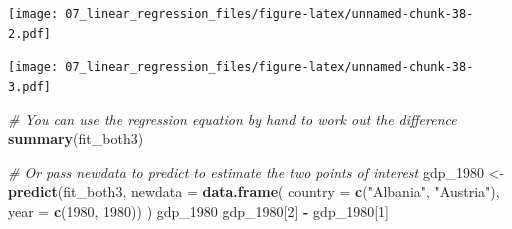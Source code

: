 \documentclass[
  12pt,
  krantz2]{krantz}
\makeatletter
\newenvironment{Shaded}{\begin{snugshade}}{\end{snugshade}}
\newcommand{\CommentTok}[1]{\textcolor[rgb]{0.56,0.35,0.01}{\textit{#1}}}
\newcommand{\DataTypeTok}[1]{\textcolor[rgb]{0.13,0.29,0.53}{#1}}
\newcommand{\DecValTok}[1]{\textcolor[rgb]{0.00,0.00,0.81}{#1}}
\newcommand{\KeywordTok}[1]{\textcolor[rgb]{0.13,0.29,0.53}{\textbf{#1}}}
\newcommand{\NormalTok}[1]{#1}
\newcommand{\OperatorTok}[1]{\textcolor[rgb]{0.81,0.36,0.00}{\textbf{#1}}}
\newcommand{\StringTok}[1]{\textcolor[rgb]{0.31,0.60,0.02}{#1}}
\newenvironment{kframe}{%
\medskip{}
\setlength{\fboxsep}{.8em}
 \def\at@end@of@kframe{}%
 \ifinner\ifhmode%
  \def\at@end@of@kframe{\end{minipage}}%
  \begin{minipage}{\columnwidth}%
 \fi\fi%
 \def\FrameCommand##1{\hskip\@totalleftmargin \hskip-\fboxsep
 \colorbox{shadecolor}{##1}\hskip-\fboxsep
     \hskip-\linewidth \hskip-\@totalleftmargin \hskip\columnwidth}%
 \MakeFramed {\advance\hsize-\width
   \@totalleftmargin\z@ \linewidth\hsize
   \@setminipage}}%
 {\par\unskip\endMakeFramed%
 \at@end@of@kframe}
\renewenvironment{Shaded}{\begin{kframe}}{\end{kframe}}
\makeatother
\begin{document}
\texttt{[image: 07\_linear\_regression\_files/figure-latex/unnamed-chunk-38-2.pdf]}

\begin{Shaded}
\end{Shaded}

\texttt{[image: 07\_linear\_regression\_files/figure-latex/unnamed-chunk-38-3.pdf]}

\begin{Shaded}
\begin{Highlighting}[]
\CommentTok{# You can use the regression equation by hand to work out the difference}
\KeywordTok{summary}\NormalTok{(fit_both3)}

\CommentTok{# Or pass newdata to predict to estimate the two points of interest}
\NormalTok{gdp_}\DecValTok{1980}\NormalTok{ <-}\StringTok{ }\KeywordTok{predict}\NormalTok{(fit_both3, }\DataTypeTok{newdata =} \KeywordTok{data.frame}\NormalTok{(}
  \DataTypeTok{country =} \KeywordTok{c}\NormalTok{(}\StringTok{"Albania"}\NormalTok{, }\StringTok{"Austria"}\NormalTok{),}
  \DataTypeTok{year =} \KeywordTok{c}\NormalTok{(}\DecValTok{1980}\NormalTok{, }\DecValTok{1980}\NormalTok{))}
\NormalTok{)}
\NormalTok{gdp_}\DecValTok{1980}
\NormalTok{gdp_}\DecValTok{1980}\NormalTok{[}\DecValTok{2}\NormalTok{] }\OperatorTok{-}\StringTok{ }\NormalTok{gdp_}\DecValTok{1980}\NormalTok{[}\DecValTok{1}\NormalTok{]}
\end{Highlighting}
\end{Shaded}
\end{document}
